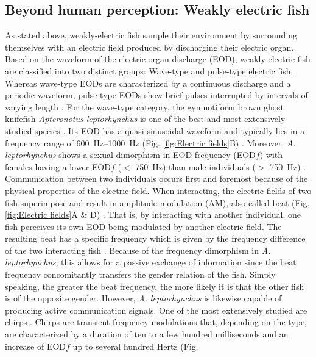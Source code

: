 \subsection{Beyond human perception: Weakly electric fish}
As stated above, weakly-electric fish sample their environment by surrounding themselves with an electric field produced by discharging their electric organ. Based on the waveform of the electric organ discharge (EOD), weakly-electric fish are classified into two distinct groups: Wave-type and pulse-type electric fish \parencite{bendaPhysicsElectrosensoryWorlds2020}. Whereas wave-type EODs are characterized by a continuous discharge and a periodic waveform, pulse-type EODs show brief pulses interrupted by intervals of varying length \parencite{bendaPhysicsElectrosensoryWorlds2020}. For the wave-type category, the gymnotiform brown ghost knifefish \textit{Apteronotus leptorhynchus} is one of the best and most extensively studied species \parencite{zupanc1993evoked, meyer1987hormone, malerAtlasBrainElectric1991, hupeEffectDifferenceFrequency2008, englerSpontaneousModulationsElectric2000a, hagedornCourtSparkElectric1985a, dunlapHormonalBodySize2002}. Its EOD has a quasi-sinusoidal waveform and typically lies in a frequency range of \SIrange{600}{1000}{\hertz} (Fig. \ref{fig:Electric fields}B) \parencite{zupanc1993evoked, zakonEODModulationsBrown2002a}. Moreover, \textit{A. leptorhynchus} shows a sexual dimorphism in EOD frequency (EOD$f$) with females having a lower EOD$f$ ($<$ \SI{750}{\hertz}) than male individuals ($>$ \SI{750}{\hertz}) \parencite{meyer1987hormone, zakonEODModulationsBrown2002a}. Communication between two individuals occurs first and foremost because of the physical properties of the electric field. When interacting, the electric fields of two fish superimpose and result in amplitude modulation (AM), also called beat (Fig. \ref{fig:Electric fields}A \& D) \parencite{zupanc1993evoked, walzNeuroethologyElectrocommunicationHow2013, benda2005spike, bendaPhysicsElectrosensoryWorlds2020}. That is, by interacting with another individual, one fish perceives its own EOD being modulated by another electric field. The resulting beat has a specific frequency which is given by the frequency difference of the two interacting fish \parencite{benda2005spike, walzNeuroethologyElectrocommunicationHow2013, bendaPhysicsElectrosensoryWorlds2020}. Because of the frequency dimorphism in \textit{A. leptorhynchus}, this allows for a passive exchange of information since the beat frequency concomitantly transfers the gender relation of the fish. Simply speaking, the greater the beat frequency, the more likely it is that the other fish is of the opposite gender. However, \textit{A. leptorhynchus} is likewise capable of producing active communication signals. One of the most extensively studied are chirps \parencite{zupanc1993evoked, zakonEODModulationsBrown2002a, englerSpontaneousModulationsElectric2000a, hupeElectrocommunicationSignalsFree2009, obotiWhyBrownGhost2022, dunlapDiversityStructureElectrocommunication2003}. Chirps are transient frequency modulations that, depending on the type, are characterized by a duration of ten to a few hundred milliseconds and an increase of EOD$f$ up to several hundred Hertz (Fig. 